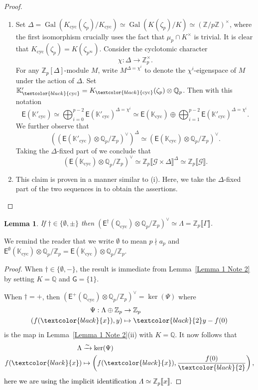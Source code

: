 \documentclass{amsart}
\newcommand{\edit}[1]{\textcolor{black}{#1}}
\newtheorem{lemma}[theorem]{Lemma}
\numberwithin{equation}{section}
\theoremstyle{remark}
\newcommand{\EC}{\mathsf{E}}
\newcommand{\cG}{\mathcal{G}}
\newcommand{\Gal}{\operatorname{Gal}}
\newcommand{\Qp}{\mathbb{Q}_p}
\newcommand{\sG}{\mathsf{G}}
\newcommand{\K}{\mathbb{K}}
\newcommand{\Zp}{\mathbb{Z}_p}
\newcommand{\Z}{\mathbb{Z}}
\newcommand{\Q}{\mathbb{Q}}
\newcommand{\cyc}{\operatorname{{cyc}}}
\theoremstyle{plain} %
\begin{document}
\begin{proof}
\begin{enumerate}
\item[(i)] Set $\Delta = \Gal(K_{\cyc}(\zeta_p)/K_{\cyc}) \simeq \Gal(K(\zeta_p)/K) \simeq (\Z/p\Z)^\times$, where the first isomorphism crucially uses the fact that $\mu_p\cap K^\times$ is trivial.
It is clear that $K_{\cyc}(\zeta_p) = K(\zeta_{p^\infty})$.
Consider the cyclotomic character
\[
\chi: \Delta \longrightarrow \Zp^\times.
\]
For any \edit{$\Zp[\Delta]$}-module $M$, write $M^{\Delta=\chi^i}$ to denote the $\chi^i$-eigenspace of $M$ under the action of $\Delta$.
Set $\K'_{\edit{\cyc}} = K_{\edit{\cyc}}(\zeta_p) \otimes \Qp$.
Then with this notation
\[
\EC(\K'_{\cyc}) \simeq \bigoplus_{i=0}^{p-2} \EC(\K'_{\cyc})^{\Delta= \chi^i} \simeq \EC(\K_{\cyc}) \oplus \bigoplus_{i=1}^{p-2} \EC(\K'_{\cyc})^{\Delta= \chi^i}.
\]
We further observe that
\[
\left( \left( \EC(\K'_{\cyc}) \otimes \Qp/\Zp \right)^\vee\right)^{\Delta} \simeq \left(\EC(\K_{\cyc}) \otimes \Qp/\Zp \right)^\vee.
\]
Taking the $\Delta$-fixed part of \cite[Theorem~1.2(1)]{Kat21} we conclude that
\[
\left(\EC(\K_{\cyc}) \otimes \Qp/\Zp \right)^\vee \simeq \Zp\llbracket \cG \times \Delta \rrbracket^{\Delta} \simeq \Zp\llbracket \cG\rrbracket.
\]
\item[(ii)]
This claim is proven in a manner similar to (i).
Here, we take the $\Delta$-fixed part of the two sequences in \cite[Theorem~1.2(\edit{3})]{Kat21} to obtain the assertions.
\end{enumerate}
\end{proof}

\begin{lemma}
\label{Corollary 2 Note 2}
If $\dagger\in \{\emptyset, \pm\}$ then $\left(\EC^{\dagger}(\Q_{\cyc} )\otimes \Qp/\Zp\right)^\vee \simeq \Lambda = \Zp\llbracket \Gamma \rrbracket$.
\end{lemma}

We remind the reader that we write $\emptyset$ to mean $p\nmid a_p$ and $\EC^{\emptyset}(\K_{\cyc} )\otimes \Qp/\Zp = \EC(\K_{\cyc} )\otimes \Qp/\Zp$.

\begin{proof}
When $\dagger \in\{\emptyset, -\}$, the result is immediate from Lemma~\ref{Lemma 1 Note 2} by setting $K=\Q$ and $\sG = \{1\}$.

When $\dagger = +$, then $\left(\EC^{+}(\Q_{\cyc})\otimes \Qp/\Zp\right)^\vee = \ker(\Psi)$ where 
\begin{align*}
\Psi: \Lambda \oplus \Zp & \rightarrow \Zp\\
(f(\edit{x}), y) & \mapsto \edit{2}y - f(0)
\end{align*}
is the map in Lemma~\ref{Lemma 1 Note 2}(ii) with $K=\Q$.
It now follows that 
\begin{align*}
\Lambda & \xrightarrow{\sim }\ker(\Psi)\\
f(\edit{x}) & \mapsto \left( f(\edit{x}), \frac{f(0)}{\edit{2}}\right), 
\end{align*}
\edit{here we are using the implicit identification $\Lambda \simeq \Zp\llbracket x\rrbracket$.}
\end{proof}
\end{document}

